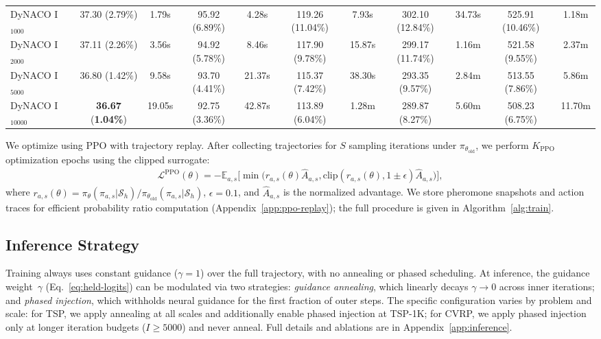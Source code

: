 \documentclass[sigconf,review]{acmart}
\begin{document}
\begin{table}[t]
{\begin{tabular}{lcccccccccc}
\midrule
DyNACO I$_{1000}$ & 37.30 (2.79\%) & 1.79s & 95.92 (6.89\%) & 4.28s & 119.26 (11.04\%) & 7.93s & 302.10 (12.84\%) & 34.73s & 525.91 (10.46\%) & 1.18m \\
DyNACO I$_{2000}$ & 37.11 (2.26\%) & 3.56s & 94.92 (5.78\%) & 8.46s & 117.90 (9.78\%) & 15.87s & 299.17 (11.74\%) & 1.16m & 521.58 (9.55\%) & 2.37m \\
DyNACO I$_{5000}$ & 36.80 (1.42\%) & 9.58s & 93.70 (4.41\%) & 21.37s & 115.37 (7.42\%) & 38.30s & 293.35 (9.57\%) & 2.84m & 513.55 (7.86\%) & 5.86m \\
DyNACO I$_{10000}$ & \textbf{36.67} (\textbf{1.04\%}) & 19.05s & 92.75 (3.36\%) & 42.87s & 113.89 (6.04\%) & 1.28m & 289.87 (8.27\%) & 5.60m & 508.23 (6.75\%) & 11.70m \\
\bottomrule
\end{tabular}
}
\end{table}

We optimize using PPO with trajectory replay.
After collecting trajectories for $S$ sampling iterations under $\pi_{\theta_{\text{old}}}$, we perform $K_{\text{PPO}}$ optimization epochs using the clipped surrogate:
\begin{multline}
\mathcal{L}^{\text{PPO}}(\theta) = -\mathbb{E}_{a,s}\Big[ \min\big( r_{a,s}(\theta) \hat{A}_{a,s}, 
\text{clip}(r_{a,s}(\theta), 1{\pm}\epsilon) \hat{A}_{a,s} \big) \Big],
\end{multline}
where $r_{a,s}(\theta) = \pi_\theta(\pi_{a,s} | \mathcal{S}_h) / \pi_{\theta_{\text{old}}}(\pi_{a,s} | \mathcal{S}_h)$, $\epsilon=0.1$, and $\hat{A}_{a,s}$ is the normalized advantage.
We store pheromone snapshots and action traces for efficient probability ratio computation (Appendix~\ref{app:ppo-replay}); the full procedure is given in Algorithm~\ref{alg:train}.



\subsection{Inference Strategy}
\label{sec:inference}
Training always uses constant guidance ($\gamma{=}1$) over the full trajectory, with no annealing or phased scheduling.
At inference, the guidance weight~$\gamma$ (Eq.~\ref{eq:held-logits}) can be modulated via two strategies: \emph{guidance annealing}, which linearly decays $\gamma \to 0$ across inner iterations; and \emph{phased injection}, which withholds neural guidance for the first fraction of outer steps.
The specific configuration varies by problem and scale: for TSP, we apply annealing at all scales and additionally enable phased injection at TSP-1K; for CVRP, we apply phased injection only at longer iteration budgets ($I{\geq}5000$) and never anneal.
Full details and ablations are in Appendix~\ref{app:inference}.
\end{document}
